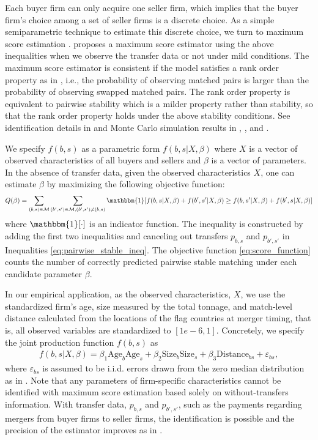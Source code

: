 \documentclass[10pt]{article}
\begin{document}
Each buyer firm can only acquire one seller firm, which implies that the buyer firm’s
choice among a set of seller firms is a discrete choice. 
As a simple semiparametric technique to estimate this discrete choice, we turn to maximum score estimation \cite{manski1975maximum,manski1985semiparametric}.
\cite{fox2018qe} proposes a maximum score
estimator using the above inequalities when we observe the transfer data or not under mild conditions. 
The maximum score estimator is consistent if the model satisfies a rank order property as in \cite{manski1975maximum,manski1985semiparametric}, i.e., the probability of observing matched pairs is larger than the probability of observing swapped matched pairs. 
The rank order property is equivalent to pairwise stability which is a milder property rather than stability, so that the rank order property holds under the above stability conditions. See identification details in \cite{fox2010qe} and Monte Carlo simulation results in \cite{fox2018qe}, \cite{akkus2015ms}, and \cite{otani2021matching_cost}.

We specify $f(b,s)$ as a parametric form $f(b,s|X,\beta)$ where $X$ is a vector of observed characteristics of all buyers and sellers and $\beta$ is a vector of parameters. 
In the absence of transfer data, given the observed characteristics $X$, one can estimate $\beta$ by maximizing the following objective function:
\begin{align}
    Q(\beta)=\sum_{(b,s)\in \mathcal{M}} \sum_{(b',s')\in \mathcal{M},(b',s')\neq (b,s)} \mathbbm{1}[f(b,s|X,\beta)+ f(b',s'|X,\beta)\ge f(b,s'|X,\beta)+f(b',s|X,\beta)]\label{eq:score_function}
\end{align}
where $\mathbbm{1}[\cdot]$ is an indicator function. 
The inequality is constructed by adding the first two inequalities and canceling out transfers $p_{b,s}$ and $p_{b',s'}$ in Inequalities \eqref{eq:pairwise_stable_ineq}.
The objective function \eqref{eq:score_function} counts the number of correctly predicted pairwise stable matching under each candidate parameter $\beta$.


In our empirical application, as the observed characteristics, $X$, we use the standardized firm's age, size measured by the total tonnage, and match-level distance calculated from the locations of the flag countries at merger timing, that is, all observed variables are standardized to $[1e-6,1]$. 
Concretely, we specify the joint production function $f(b,s)$ as
\begin{align}
    f(b,s|X,\beta)= \beta_1 \text{Age}_{b}\text{Age}_{s} + \beta_2 \text{Size}_{b}\text{Size}_{s} + \beta_3 \text{Distance}_{bs} + \varepsilon_{bs},\label{eq:joint_production}
\end{align}
where $\varepsilon_{bs}$ is assumed to be i.i.d. errors drawn from the zero median distribution as in \cite{fox2018qe}. 
Note that any parameters of firm-specific characteristics cannot be identified with maximum score estimation based solely on without-transfers information. With transfer data, $p_{b,s}$ and $p_{b',s'}$, such as the payments regarding mergers from buyer firms to seller firms, the identification is possible and the precision of the estimator improves as in \cite{akkus2015ms}.
\end{document}
